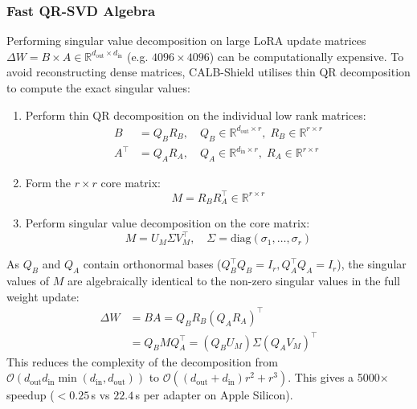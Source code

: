 \documentclass[conference]{IEEEtran}
\begin{document}
\subsubsection{Fast QR-SVD Algebra}
Performing singular value decomposition on large LoRA update matrices $\Delta W = B \times A \in \mathbb{R}^{d_{\text{out}} \times d_{\text{in}}}$ (e.g. $4096 \times 4096$) can be computationally expensive. To avoid reconstructing dense matrices, CALB-Shield utilises thin QR decomposition to compute the exact singular values:
\begin{enumerate}
    \item Perform thin QR decomposition on the individual low rank matrices:
    \begin{align}
    B &= Q_B R_B, \quad Q_B \in \mathbb{R}^{d_{\text{out}} \times r}, \; R_B \in \mathbb{R}^{r \times r} \\
    A^\top &= Q_A R_A, \quad Q_A \in \mathbb{R}^{d_{\text{in}} \times r}, \; R_A \in \mathbb{R}^{r \times r}
    \end{align}
    \item Form the $r \times r$ core matrix:
    \begin{equation}
    M = R_B R_A^\top \in \mathbb{R}^{r \times r}
    \end{equation}
    \item Perform singular value decomposition on the core matrix:
    \begin{equation}
    M = U_M \Sigma V_M^\top, \quad \Sigma = \text{diag}(\sigma_1, \dots, \sigma_r)
    \end{equation}
\end{enumerate}
As $Q_B$ and $Q_A$ contain orthonormal bases ($Q_B^\top Q_B = I_r, Q_A^\top Q_A = I_r$), the singular values of $M$ are algebraically identical to the non-zero singular values in the full weight update:
\begin{align}
\Delta W &= B A = Q_B R_B (Q_A R_A)^\top \nonumber \\
&= Q_B M Q_A^\top = (Q_B U_M) \Sigma (Q_A V_M)^\top
\end{align}
This reduces the complexity of the decomposition from $\mathcal{O}(d_{\text{out}} d_{\text{in}} \min(d_{\text{in}}, d_{\text{out}}))$ to $\mathcal{O}((d_{\text{out}} + d_{\text{in}}) r^2 + r^3)$. This gives a 5000$\times$ speedup ($< 0.25$\,s vs $22.4$\,s per adapter on Apple Silicon).
\end{document}
